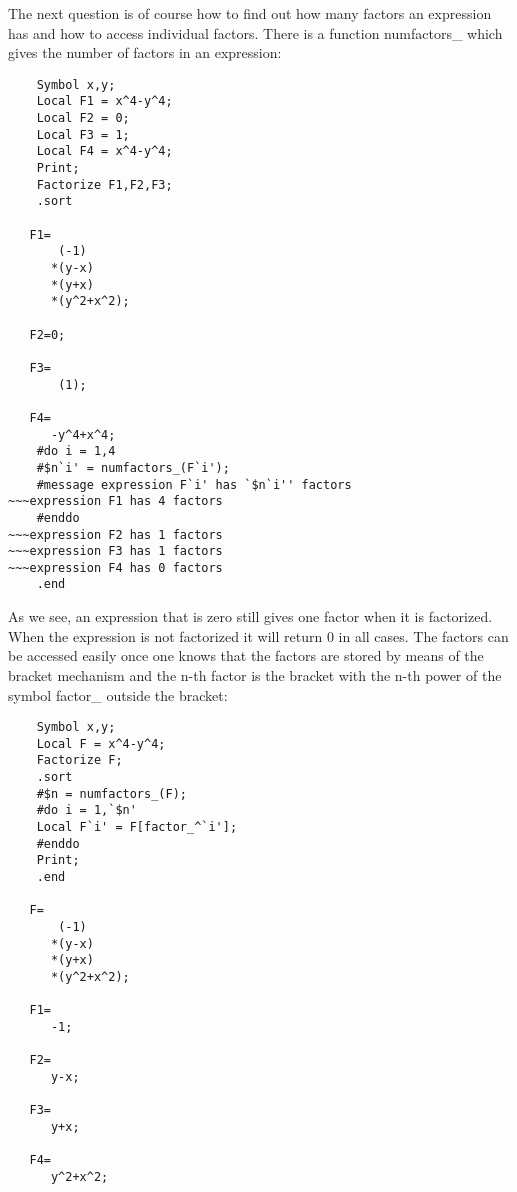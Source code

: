 \noindent The next question is of course how to find out how many factors 
an expression has and how to access individual factors. There is a function 
numfactors\_ which gives the number of factors in an expression:
\begin{verbatim}
    Symbol x,y;
    Local F1 = x^4-y^4;
    Local F2 = 0;
    Local F3 = 1;
    Local F4 = x^4-y^4;
    Print;
    Factorize F1,F2,F3;
    .sort

   F1=
       (-1)
      *(y-x)
      *(y+x)
      *(y^2+x^2);
    
   F2=0;

   F3=
       (1);

   F4=
      -y^4+x^4;
    #do i = 1,4
    #$n`i' = numfactors_(F`i');
    #message expression F`i' has `$n`i'' factors
~~~expression F1 has 4 factors
    #enddo
~~~expression F2 has 1 factors
~~~expression F3 has 1 factors
~~~expression F4 has 0 factors
    .end
\end{verbatim}
As we see, an expression that is zero still gives one factor when it is 
factorized. When the expression is not factorized it will return 0 in all 
cases. The factors can be accessed easily once one knows that the factors 
are stored by means of the bracket mechanism and the n-th factor is the 
bracket with the n-th power of the symbol factor\_ outside the bracket:
\begin{verbatim}
    Symbol x,y;
    Local F = x^4-y^4;
    Factorize F;
    .sort
    #$n = numfactors_(F);
    #do i = 1,`$n'
    Local F`i' = F[factor_^`i'];
    #enddo
    Print;
    .end

   F=
       (-1)
      *(y-x)
      *(y+x)
      *(y^2+x^2);

   F1=
      -1;

   F2=
      y-x;

   F3=
      y+x;

   F4=
      y^2+x^2;
\end{verbatim}

